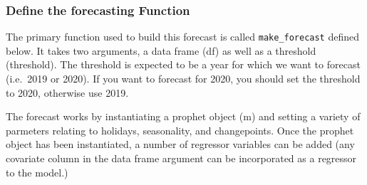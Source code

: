 \documentclass[]{article}
\newenvironment{Shaded}{\begin{snugshade}}{\end{snugshade}}
\newcommand{\KeywordTok}[1]{\textcolor[rgb]{0.13,0.29,0.53}{\textbf{{#1}}}}
\newcommand{\DataTypeTok}[1]{\textcolor[rgb]{0.13,0.29,0.53}{{#1}}}
\newcommand{\DecValTok}[1]{\textcolor[rgb]{0.00,0.00,0.81}{{#1}}}
\newcommand{\StringTok}[1]{\textcolor[rgb]{0.31,0.60,0.02}{{#1}}}
\newcommand{\OtherTok}[1]{\textcolor[rgb]{0.56,0.35,0.01}{{#1}}}
\newcommand{\NormalTok}[1]{{#1}}
\begin{document}
\begin{Shaded}
\end{Shaded}

\subsubsection{Define the forecasting
Function}\label{define-the-forecasting-function}

The primary function used to build this forecast is called
\texttt{make\_forecast} defined below. It takes two arguments, a data
frame (df) as well as a threshold (threshold). The threshold is expected
to be a year for which we want to forecast (i.e.~2019 or 2020). If you
want to forecast for 2020, you should set the threshold to 2020,
otherwise use 2019.

The forecast works by instantiating a prophet object (m) and setting a
variety of parmeters relating to holidays, seasonality, and
changepoints. Once the prophet object has been instantiated, a number of
regressor variables can be added (any covariate column in the data frame
argument can be incorporated as a regressor to the model.)
\end{document}
